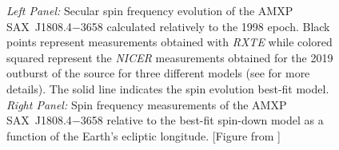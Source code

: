 \documentclass[graybox]{svmult}
\def \rxte {{\em RXTE\xspace}}
\def \saxj{{\rm SAX~J1808.4$-$3658\xspace}}
\def \nicer{{\em NICER\xspace}}
\begin{document}
\begin{figure}
\begin{subfigure}{.5\textwidth}
  \label{fig:sfig2}
\end{subfigure}
\caption{\textit{Left Panel:} Secular spin frequency evolution of the AMXP \saxj{} calculated relatively to the 1998 epoch. Black points represent measurements obtained with \rxte{} while colored squared represent the \nicer{} measurements obtained for the 2019 outburst of the source for three different models (see \cite{Bult2019c} for more details). The solid line indicates the spin evolution best-fit model. \textit{Right Panel:} Spin frequency measurements of the AMXP \saxj{} relative to the best-fit spin-down model as a function of the Earth's ecliptic longitude. [Figure from \cite{Bult2019c}]}
\label{fig:1808_sec}
\end{figure}

\end{document}
